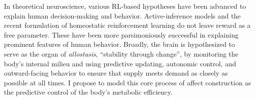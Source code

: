 \begin{singlespace}
\im
In theoretical neuroscience, various RL-based hypotheses have been advanced
to explain human decision-making and behavior.  Active-inference models and
the recent formulation of homeostatic reinforcement learning do not leave
reward as a free parameter\cite{Keramati2014,Pezzulo2018,Morville2018a}.
These have been more parsimoniously successful in explaining prominent
features of human behavior.  Broadly, the brain is hypothesized to serve
as the organ of \emph{allostasis}, ``stability through change'', by
monitoring the body's internal milieu and using predictive updating,
autonomic control, and outward-facing behavior to ensure that supply meets
demand as closely as possible at all times\cite{Barrett2015,BarrettTheoryOfConstructed2017,Kleckner2017}. I
propose to model this core process of affect construction as the predictive
control of the body's metabolic efficiency.
\end{singlespace}
